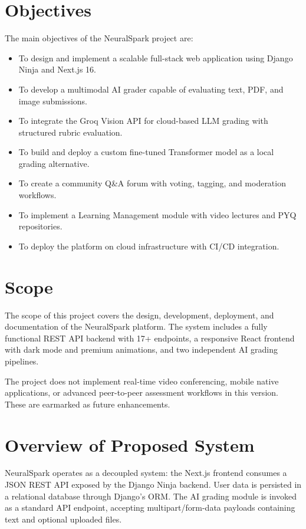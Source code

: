 \documentclass[12pt,a4paper]{report}
\begin{document}
\section{Objectives}
The main objectives of the NeuralSpark project are:

\begin{itemize}
    \item To design and implement a scalable full-stack web application using Django Ninja and Next.js 16.
    \item To develop a multimodal AI grader capable of evaluating text, PDF, and image submissions.
    \item To integrate the Groq Vision API for cloud-based LLM grading with structured rubric evaluation.
    \item To build and deploy a custom fine-tuned Transformer model as a local grading alternative.
    \item To create a community Q\&A forum with voting, tagging, and moderation workflows.
    \item To implement a Learning Management module with video lectures and PYQ repositories.
    \item To deploy the platform on cloud infrastructure with CI/CD integration.
\end{itemize}

\section{Scope}
The scope of this project covers the design, development, deployment, and documentation of the
NeuralSpark platform. The system includes a fully functional REST API backend with 17+ endpoints,
a responsive React frontend with dark mode and premium animations, and two independent AI grading pipelines.

The project does not implement real-time video conferencing, mobile native applications, or
advanced peer-to-peer assessment workflows in this version. These are earmarked as future enhancements.

\section{Overview of Proposed System}
NeuralSpark operates as a decoupled system: the Next.js frontend consumes a JSON REST API
exposed by the Django Ninja backend. User data is persisted in a relational database through
Django's ORM. The AI grading module is invoked as a standard API endpoint, accepting
multipart/form-data payloads containing text and optional uploaded files.
\end{document}
